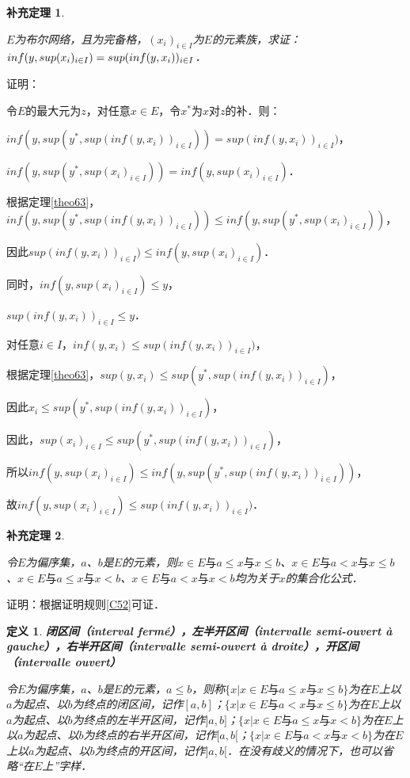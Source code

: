 \documentclass[12pt, a4paper, oneside]{book}
\newtheorem{cor}{补充定理}
\newtheorem{de}{定义}
\begin{document}
			\begin{cor}\label{cor203}
				\hfill\par
				$E$为布尔网络，且为完备格，$(x_i)_{i\in I}$为$E$的元素族，求证：$inf(y, sup(x_i)_{i\in I})=\\sup(inf(y, x_i))_{i\in I}$．
			\end{cor}
			证明：
			\par
			令$E$的最大元为$z$，对任意$x\in E$，令$x^*$为$x$对$z$的补．则：
			\par
			$inf(y, sup(y^*, sup(inf(y, x_i))_{i\in I}))= sup(inf(y, x_i))_{i\in I})$，
			\par
			$inf(y, sup(y^*, sup(x_i)_{i\in I}))=inf(y, sup(x_i)_{i\in I})$．
			\par
			根据定理\ref{theo63}，$inf(y, sup(y^*, sup(inf(y, x_i))_{i\in I}))\leq inf(y, sup(y^*, sup(x_i)_{i\in I}))$，
			\par
			因此$sup(inf(y, x_i))_{i\in I})\leq inf(y, sup(x_i)_{i\in I})$．
			\par
			同时，$inf(y, sup(x_i)_{i\in I})\leq y$，
			\par
			$sup(inf(y, x_i))_{i\in I}\leq y$．
			\par
			对任意$i\in I$，$inf(y, x_i)\leq sup(inf(y, x_i))_{i\in I})$，
			\par
			根据定理\ref{theo63}，$sup(y, x_i)\leq sup(y^*, sup(inf(y, x_i))_{i\in I})$，
			\par
			因此$x_i\leq sup(y^*, sup(inf(y, x_i))_{i\in I})$，
			\par
			因此，$sup(x_i)_{i\in I}\leq sup(y^*, sup(inf(y, x_i))_{i\in I})$，
			\par
			所以$inf(y, sup(x_i)_{i\in I})\leq inf(y, sup(y^*, sup(inf(y, x_i))_{i\in I}))$，
			\par
			故$inf(y, sup(x_i)_{i\in I})\leq sup(inf(y, x_i))_{i\in I})$．
			
			\begin{cor}\label{cor204}
				\hfill\par
				令$E$为偏序集，$a$、$b$是$E$的元素，则$x\in E\text{与}a\leq x\text{与}x\leq b$、$x\in E\text{与}a<x\text{与}x\leq b$、$x\in E\text{与}a\leq x\text{与}x<b$、$x\in E\text{与}a<x\text{与}x<b$均为关于$x$的集合化公式．
			\end{cor}
			证明：根据证明规则\ref{C52}可证．

			\begin{de}
				\textbf{闭区间（interval fermé），左半开区间（intervalle semi-ouvert à gauche），右半开区间（intervalle semi-ouvert à droite），开区间（intervalle ouvert）}
				\par
				令$E$为偏序集，$a$、$b$是$E$的元素，$a\leq b$，则称$\{x|x\in E\text{与}a\leq x\text{与}x\leq b\}$为在$E$上以$a$为起点、以$b$为终点的闭区间，记作$[a, b]$；$\{x|x\in E\text{与}a<x\text{与}x\leq b\}$为在$E$上以$a$为起点、以$b$为终点的左半开区间，记作$]a, b]$；$\{x|x\in E\text{与}a\leq x\text{与}x<b\}$为在$E$上以$a$为起点、以$b$为终点的右半开区间，记作$[a, b[$；$\{x|x\in E\text{与}a<x\text{与}x<b\}$为在$E$上以$a$为起点、以$b$为终点的开区间，记作$]a, b[$．在没有歧义的情况下，也可以省略“在$E$上”字样．
			\end{de}
			
\end{document}
